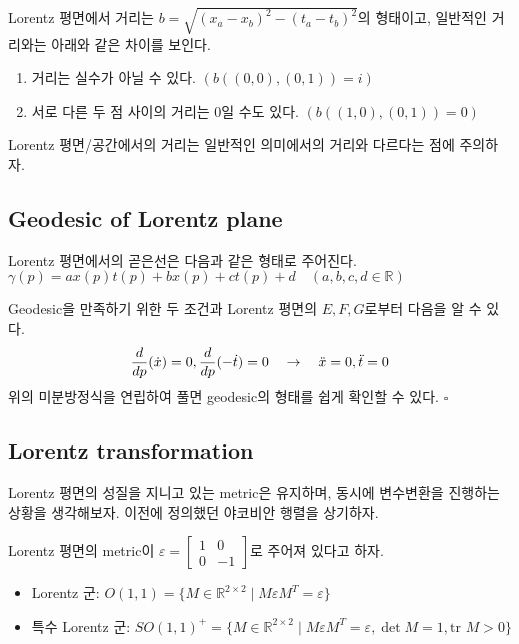\documentclass[10pt,a4paper]{article}
\renewenvironment{proof}{{\sffamily\bfseries Proof:~}}{\hfill$\square$}
\begin{document}
\begin{tcolorbox}[title=Lorentz 평면에서의 거리]
Lorentz 평면에서 거리는 $b=\sqrt{(x_a-x_b)^2-(t_a-t_b)^2}$의 형태이고, 일반적인 거리와는 아래와 같은 차이를 보인다.
\begin{enumerate}
\item 거리는 실수가 아닐 수 있다. $(b((0,0),(0,1))=i)$
\item 서로 다른 두 점 사이의 거리는 0일 수도 있다. $(b((1,0),(0,1))=0)$
\end{enumerate}
\end{tcolorbox}
Lorentz 평면/공간에서의 거리는 일반적인 의미에서의 거리와 다르다는 점에 주의하자.

\subsection{Geodesic of Lorentz plane}

\begin{tcolorbox}[title=Lorentz 평면에서의 곧은선]
Lorentz 평면에서의 곧은선은 다음과 같은 형태로 주어진다.
\\$\gamma(p)=ax(p)t(p)+bx(p)+ct(p)+d \quad (a,b,c,d\in \mathbb{R})$
\end{tcolorbox}
\begin{proof}
Geodesic을 만족하기 위한 두 조건과 Lorentz 평면의 $E, F, G$로부터 다음을 알 수 있다.
\[\frac{d}{dp}(\dot{x})=0, \frac{d}{dp}(-\dot{t})=0\quad \to \quad \Ddot{x}=0,\Ddot{t}=0\]
위의 미분방정식을 연립하여 풀면 geodesic의 형태를 쉽게 확인할 수 있다. 
\end{proof}
%
%
\subsection{Lorentz transformation}
Lorentz 평면의 성질을 지니고 있는 metric은 유지하며, 동시에 변수변환을 진행하는 상황을 생각해보자. 이전에 정의했던 야코비안 행렬을 상기하자.
\begin{tcolorbox}[title = Lorentz 군]
Lorentz 평면의 metric이 $\varepsilon = \begin{bmatrix} 1 & 0 \\ 0 & -1\end{bmatrix}$로 주어져 있다고 하자.
\begin{itemize}
    \item Lorentz 군: $O(1, 1) = \{ M \in \mathbb{R}^{2 \times 2} \mid M\varepsilon M^T = \varepsilon\}$
    \item 특수 Lorentz 군: $SO(1, 1)^+ = \{ M \in \mathbb{R}^{2 \times 2} \mid M\varepsilon M^T = \varepsilon, \det M = 1, \text{tr } M > 0\}$
\end{itemize}
\end{tcolorbox}
\end{document}
